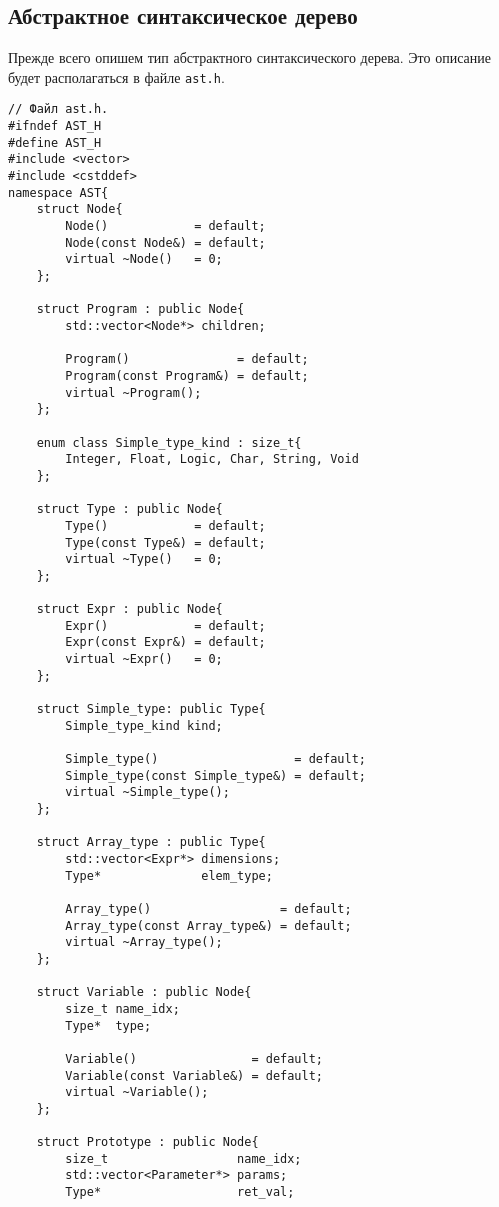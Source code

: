\documentclass[10pt]{article}
\newcounter{lem}[section]
\newcounter{defin}[section]
\begin{document}
    \subsection{Абстрактное синтаксическое дерево}
Прежде всего опишем тип абстрактного синтаксического дерева. Это описание будет располагаться в файле \texttt{ast.h}.
\begin{verbatim}
// Файл ast.h.
#ifndef AST_H
#define AST_H
#include <vector>
#include <cstddef>
namespace AST{
    struct Node{
        Node()            = default;
        Node(const Node&) = default;
        virtual ~Node()   = 0;
    };

    struct Program : public Node{
        std::vector<Node*> children;
        
        Program()               = default;
        Program(const Program&) = default;
        virtual ~Program();
    };
    
    enum class Simple_type_kind : size_t{
        Integer, Float, Logic, Char, String, Void
    };
    
    struct Type : public Node{
        Type()            = default;
        Type(const Type&) = default;
        virtual ~Type()   = 0;
    };
    
    struct Expr : public Node{
        Expr()            = default;
        Expr(const Expr&) = default;
        virtual ~Expr()   = 0;
    };
    
    struct Simple_type: public Type{
        Simple_type_kind kind;
        
        Simple_type()                   = default;
        Simple_type(const Simple_type&) = default;
        virtual ~Simple_type();
    };
    
    struct Array_type : public Type{
        std::vector<Expr*> dimensions;
        Type*              elem_type;
        
        Array_type()                  = default;
        Array_type(const Array_type&) = default;
        virtual ~Array_type();
    };
    
    struct Variable : public Node{
        size_t name_idx;
        Type*  type;
        
        Variable()                = default;
        Variable(const Variable&) = default;
        virtual ~Variable();
    };
    
    struct Prototype : public Node{
        size_t                  name_idx;
        std::vector<Parameter*> params;
        Type*                   ret_val;
        

\end{verbatim}
\end{document}
